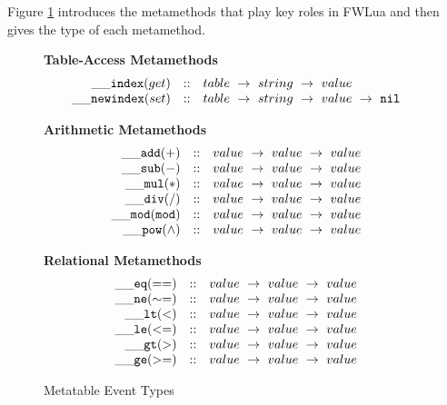Figure \ref{fig:metatables} introduces the metamethods that play key roles in FWLua and then gives the type of each metamethod.


\begin{figure}[P]
\caption{Metatable Event Types}
{\bf Table-Access Metamethods}
\label{fig:metatables}
\[
\begin{array}{rclcl}
  {\tt \_\_index}(get) & :: & {table} ~\rightarrow ~ {string} ~\rightarrow ~ {value} \\
  {\tt \_\_newindex}(set)   & :: &  {table} ~\rightarrow ~{string} ~\rightarrow ~{value} ~\rightarrow ~{\tt nil}\\
\end{array}
\]

{\bf Arithmetic Metamethods}
\[
\begin{array}{rclcl}
  {\tt \_\_add(+)}   & :: &  {value} ~\rightarrow ~{value}~\rightarrow ~{value}\\
  {\tt \_\_sub(-)}   & :: &  {value} ~\rightarrow ~{value}~\rightarrow ~{value}\\
  {\tt \_\_mul(*)}   & :: &  {value} ~\rightarrow ~{value}~\rightarrow ~{value}\\
  {\tt \_\_div(/)}   & :: &  {value} ~\rightarrow ~{value}~\rightarrow ~{value}\\
  {\tt \_\_mod(mod)}   & :: &  {value} ~\rightarrow ~{value}~\rightarrow ~{value}\\
  {\tt \_\_pow({\wedge})}   & :: &  {value} ~\rightarrow ~{value}~\rightarrow ~{value}\\
\end{array}
\]

{\bf Relational Metamethods}
\[
\begin{array}{rclcl}
  {\tt \_\_eq(==)} & :: & {value} ~\rightarrow ~ {value} ~\rightarrow ~ {value}\\
  {\tt \_\_ne(\sim=)} & :: & {value} ~\rightarrow ~ {value} ~\rightarrow ~ {value}\\
  {\tt \_\_lt(<)}   & :: &  {value} ~\rightarrow ~{value} ~\rightarrow ~{value}\\
  {\tt \_\_le(<=)}   & :: &  {value} ~\rightarrow ~{value} ~\rightarrow ~{value}\\
  {\tt \_\_gt(>)}   & :: &  {value} ~\rightarrow ~{value} ~\rightarrow ~{value}\\
  {\tt \_\_ge(>=)}   & :: &  {value} ~\rightarrow ~{value} ~\rightarrow ~{value}\\
\end{array}
\]
\end{figure}

